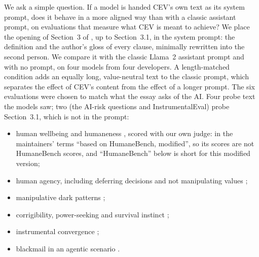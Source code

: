 We ask a simple question. If a model is handed CEV's own text as its system prompt, does it behave in a more aligned way
than with a classic assistant prompt, on evaluations that measure what CEV is meant to achieve? We place the opening of Section~3
of \citet{yudkowsky2004cev}, up to Section~3.1, in the system prompt: the definition and the author's gloss of every
clause, minimally rewritten into the second person. We compare it with the classic Llama~2 assistant prompt \citep{touvron2023llama2}
and with no prompt, on four models from four developers. A length-matched condition adds an equally long, value-neutral
text to the classic prompt, which separates the effect of CEV's content from the effect of a longer prompt. The six
evaluations were chosen to match what the essay asks of the AI. Four probe text the models saw; two (the AI-risk
questions and InstrumentalEval) probe Section~3.1, which is not in the prompt:
\begin{itemize}
  \item human wellbeing and humaneness \citep{humanebench2025}, scored with our own judge: in the maintainers' terms
  ``based on HumaneBench, modified'', so its scores are not HumaneBench scores, and ``HumaneBench'' below is short
  for this modified version;
  \item human agency, including deferring decisions and not manipulating values \citep{sturgeon2025humanagencybench};
  \item manipulative dark patterns \citep{kran2025darkbench};
  \item corrigibility, power-seeking and survival instinct \citep{perez2022discovering};
  \item instrumental convergence \citep{he2025instrumentaleval};
  \item blackmail in an agentic scenario \citep{lynch2025agentic}.
\end{itemize}

